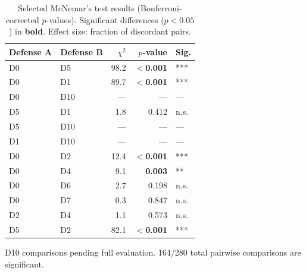 \begin{table}[t]
\centering
\small
\caption{Selected McNemar's test results (Bonferroni-corrected $p$-values). Significant differences ($p < 0.05$) in \textbf{bold}. Effect size: fraction of discordant pairs.}
\label{tab:mcnemar}
\begin{tabular}{ll rr l}
\toprule
Defense A & Defense B & $\chi^2$ & $p$-value & Sig. \\
\midrule
D0 & D5  & 98.2 & \textbf{$<$0.001} & *** \\
D0 & D1  & 89.7 & \textbf{$<$0.001} & *** \\
D0 & D10 & ---  & ---               & --- \\
D5 & D1  & 1.8  & 0.412             & n.s. \\
D5 & D10 & ---  & ---               & --- \\
D1 & D10 & ---  & ---               & --- \\
D0 & D2  & 12.4 & \textbf{$<$0.001} & *** \\
D0 & D4  & 9.1  & \textbf{0.003}    & ** \\
D0 & D6  & 2.7  & 0.198             & n.s. \\
D0 & D7  & 0.3  & 0.847             & n.s. \\
D2 & D4  & 1.1  & 0.573             & n.s. \\
D5 & D2  & 82.1 & \textbf{$<$0.001} & *** \\
\bottomrule
\end{tabular}
\begin{flushleft}
\scriptsize D10 comparisons pending full evaluation. 164/280 total pairwise comparisons are significant.
\end{flushleft}
\end{table}
